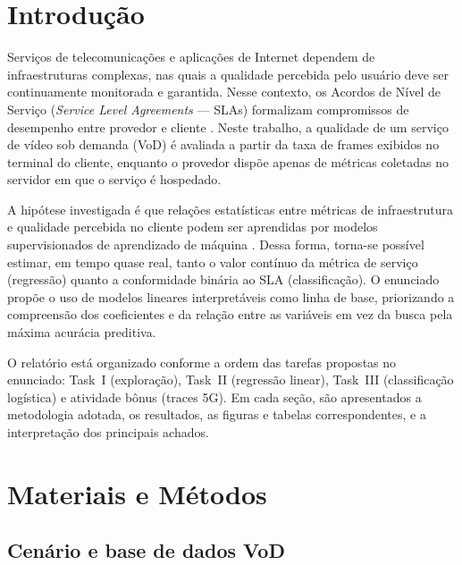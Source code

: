 \documentclass[12pt,a4paper]{article}
\begin{document}
\tableofcontents
\newpage

\section{Introdução}

Serviços de telecomunicações e aplicações de Internet dependem de infraestruturas
complexas, nas quais a qualidade percebida pelo usuário deve ser continuamente
monitorada e garantida. Nesse contexto, os Acordos de Nível de Serviço
(\textit{Service Level Agreements} --- SLAs) formalizam compromissos de desempenho
entre provedor e cliente \cite{james2013}. Neste trabalho, a qualidade de um serviço
de vídeo sob demanda (VoD) é avaliada a partir da taxa de frames exibidos no terminal
do cliente, enquanto o provedor dispõe apenas de métricas coletadas no servidor em que
o serviço é hospedado.

A hipótese investigada é que relações estatísticas entre métricas de infraestrutura e
qualidade percebida no cliente podem ser aprendidas por modelos supervisionados de
aprendizado de máquina \cite{yanggratoken2014}. Dessa forma, torna-se possível estimar,
em tempo quase real, tanto o valor contínuo da métrica de serviço (regressão) quanto a
conformidade binária ao SLA (classificação). O enunciado propõe o uso de modelos
lineares interpretáveis como linha de base, priorizando a compreensão dos coeficientes
e da relação entre as variáveis em vez da busca pela máxima acurácia preditiva.

O relatório está organizado conforme a ordem das tarefas propostas no enunciado:
Task~I (exploração), Task~II (regressão linear), Task~III (classificação logística) e
atividade bônus (traces 5G). Em cada seção, são apresentados a metodologia adotada,
os resultados, as figuras e tabelas correspondentes, e a interpretação dos principais
achados.

\section{Materiais e Métodos}

\subsection{Cenário e base de dados VoD}
\end{document}

